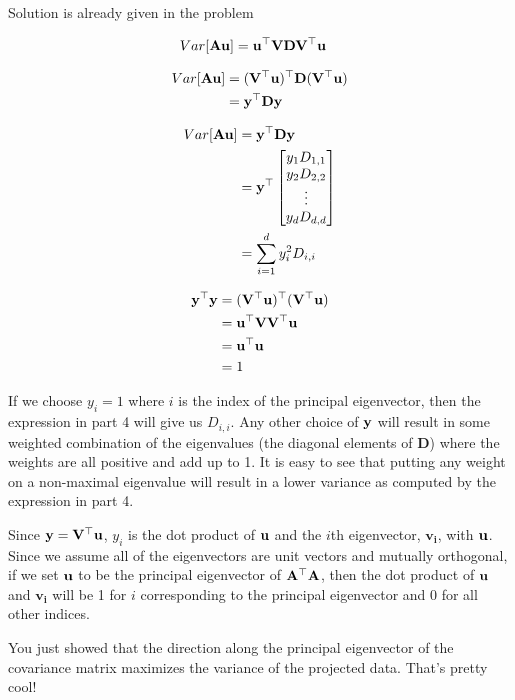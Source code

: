 \begin{sol}
\be
\item Solution is already given in the problem
\item 
\begin{align*}
Var[\mathbf{A} \mathbf{u}] &=\mathbf{u}^\top \mathbf{V} \mathbf{D} \mathbf{V}^\top \mathbf{u}
\end{align*}

\item 
\begin{align*}
Var[\mathbf{A} \mathbf{u}] &= (\mathbf{V}^\top \mathbf{u})^\top \mathbf{D} (\mathbf{V}^\top \mathbf{u}) \\
&= \mathbf{y}^\top \mathbf{D} \mathbf{y}
\end{align*}

\item
\begin{align*}
Var[\mathbf{A} \mathbf{u}] &= \mathbf{y}^\top \mathbf{D} \mathbf{y} \\
&= \mathbf{y}^\top \begin{bmatrix} y_1 D_{1,1} \\  y_2 D_{2,2} \\ \vdots \\ y_d D_{d,d} \end{bmatrix} \\
&= \sum_{i=1}^d y_i^2 D_{i,i}
\end{align*}


\item
\begin{align*}
\mathbf{y}^\top \mathbf{y} &= (\mathbf{V}^\top \mathbf{u})^\top (\mathbf{V}^\top \mathbf{u}) \\
&= \mathbf{u}^\top \mathbf{V} \mathbf{V}^\top \mathbf{u} \\
&= \mathbf{u}^\top  \mathbf{u} \\
&= 1
\end{align*}


\item If we choose $y_i = 1$ where $i$ is the index of the principal eigenvector, then the expression in part 4 will give us $D_{i,i}$.  Any other choice of $\mathbf{y}$ will result in some weighted combination of the eigenvalues (the diagonal elements of $\mathbf{D}$) where the weights are all positive and add up to 1.  It is easy to see that putting any weight on a non-maximal eigenvalue will result in a lower variance as computed by the expression in part 4.


\item Since $\mathbf{y} = \mathbf{V}^\top \mathbf{u}$, $y_i$ is the dot product of $\mathbf{u}$ and the $i$th eigenvector, $\mathbf{v_i}$, with $\mathbf{u}$.  Since we assume all of the eigenvectors are unit vectors and mutually orthogonal, if we set $\mathbf{u}$ to be the principal eigenvector of $\mathbf{A}^\top \mathbf{A}$, then the dot product of $\mathbf{u}$ and $\mathbf{v_i}$ will be 1 for $i$ corresponding to the principal eigenvector and 0 for all other indices.

\item You just showed that the direction along the principal eigenvector of the covariance matrix maximizes the variance of the projected data.  That's pretty cool!

\ee
\end{sol}

